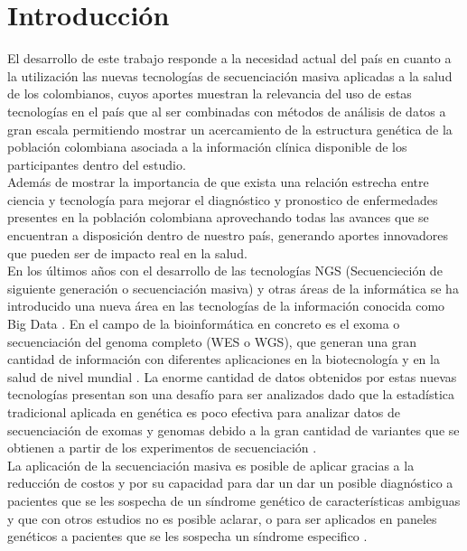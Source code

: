 \chapter{Introducci\'{o}n}


El desarrollo de este trabajo responde a la necesidad actual del país en cuanto a la utilización las nuevas tecnologías de secuenciación masiva aplicadas a la salud de los colombianos, cuyos aportes muestran la relevancia del uso de estas tecnologías en el país que al ser combinadas con métodos de análisis de datos a gran escala permitiendo mostrar un acercamiento de la estructura genética de la población colombiana asociada a la información clínica disponible de los participantes dentro del estudio.\\

Además de mostrar la importancia de que exista una relación estrecha entre ciencia y tecnología para mejorar el diagnóstico y pronostico de enfermedades presentes en la población colombiana aprovechando todas las avances que se encuentran a disposición dentro de nuestro país, generando aportes innovadores que pueden ser de impacto real en la salud.\\

En los últimos años con el desarrollo de las tecnologías NGS (Secuencieción de siguiente generación o secuenciación masiva) y otras áreas de la informática se ha introducido una nueva área en las tecnologías de la información conocida como Big Data \cite{Mohammed2014}. En el campo de la bioinformática en concreto es el exoma o secuenciación del genoma completo (WES o WGS), que generan una gran cantidad de información con diferentes aplicaciones en la biotecnología y en la  salud de nivel mundial \cite{Hwang2015}. La enorme cantidad de datos obtenidos por estas nuevas tecnologías presentan son una desafío para ser analizados dado que la estadística tradicional aplicada en genética es poco efectiva para analizar datos de secuenciación de exomas y genomas debido a la gran cantidad de variantes que se obtienen a partir de los experimentos de secuenciación \cite{Wu2014,Mohammed2014}.\\

La aplicación de la secuenciación masiva es posible de aplicar gracias a  la reducción de costos y por su capacidad para dar un dar un posible diagnóstico a pacientes que se les sospecha de un síndrome genético de características ambiguas y que con otros estudios no es posible aclarar, o para ser aplicados en paneles genéticos a pacientes que se les sospecha un síndrome especifico \cite{Hegde2017}.\\

